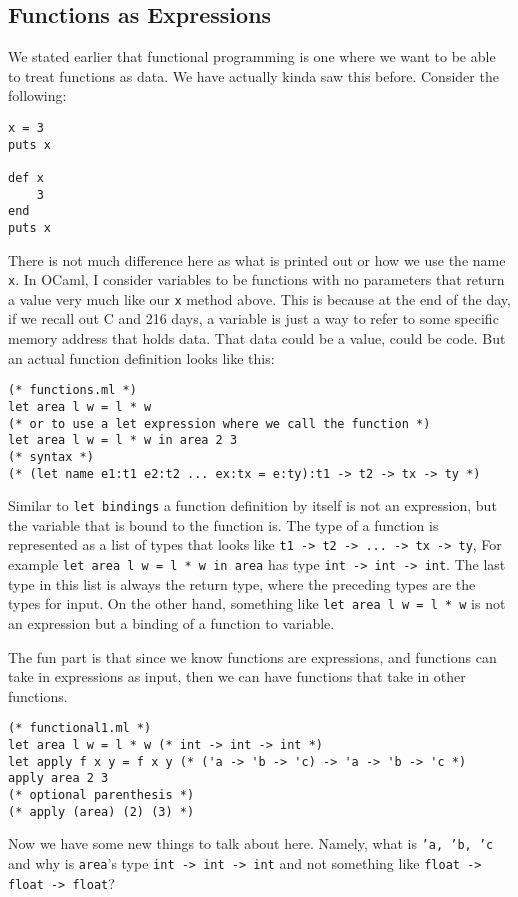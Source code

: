 \documentclass[main.tex]{subfiles}
\begin{document}
\subsection{Functions as Expressions}
We stated earlier that functional programming is one where we want to be able to treat functions as data. We have actually kinda saw this before. Consider the following:
\begin{lstlisting}[style=Myrubystyle]
x = 3
puts x

def x
    3
end
puts x
\end{lstlisting}
There is not much difference here as what is printed out or how we use the name \texttt{x}. In OCaml, I consider variables to be functions with no parameters that return a value very much like our \texttt{x} method above. This is because at the end of the day, if we recall out C and 216 days, a variable is just a way to refer to some specific memory address that holds data. That data could be a value, could be code. But an actual function definition looks like this:
\begin{lstlisting}[style=Myocamlstyle]
(* functions.ml *)
let area l w = l * w
(* or to use a let expression where we call the function *)
let area l w = l * w in area 2 3
(* syntax *)
(* (let name e1:t1 e2:t2 ... ex:tx = e:ty):t1 -> t2 -> tx -> ty *)
\end{lstlisting}
Similar to \texttt{let bindings} a function definition by itself is not an expression, but the variable that is bound to the function is. The type of a function is represented as a list of types that looks like \texttt{t1 -> t2 -> ... -> tx -> ty}, For example \texttt{let area l w = l * w in area} has type \texttt{int -> int -> int}. The last type in this list is always the return type, where the preceding types are the types for input. On the other hand, something like \texttt{let area l w = l * w} is not an expression but a binding of a function to variable.

The fun part is that since we know functions are expressions, and functions can take in expressions as input, then we can have functions that take in other functions. 
\begin{lstlisting}[style=Myocamlstyle]
(* functional1.ml *)
let area l w = l * w (* int -> int -> int *)
let apply f x y = f x y (* ('a -> 'b -> 'c) -> 'a -> 'b -> 'c *)
apply area 2 3
(* optional parenthesis *)
(* apply (area) (2) (3) *)
\end{lstlisting}
Now we have some new things to talk about here. Namely, what is \texttt{'a, 'b, 'c} and why is \texttt{area}'s type \texttt{int -> int -> int} and not something like \texttt{float -> float -> float}?
\end{document}
